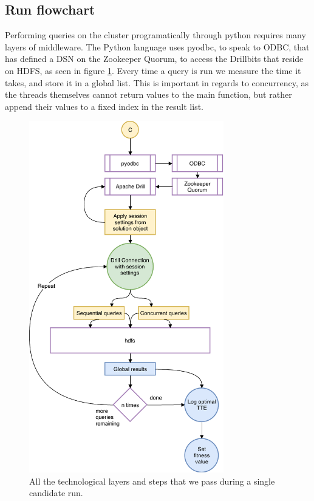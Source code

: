\documentclass[a4paper,english]{report}
\begin{document}
			\subsection{Run flowchart}
				\label{sec:runs}
				Performing queries on the cluster programatically through python requires many layers of middleware. The Python language uses pyodbc, to speak to ODBC, that has defined a DSN on the Zookeeper Quorum, to access the Drillbits that reside on HDFS, as seen in figure \ref{fig:run_workflow}. Every time a query is run we measure the time it takes, and store it in a global list. This is important in regards to concurrency, as the threads themselves cannot return values to the main function, but rather append their values to a fixed index in the result list.
				\begin{figure}[H]
					\centering
					\includegraphics[width=240pt]{run_workflow}
					\caption{All the technological layers and steps that we pass during a single candidate run.}
					\label{fig:run_workflow}
				\end{figure}
			\clearpage
\end{document}

